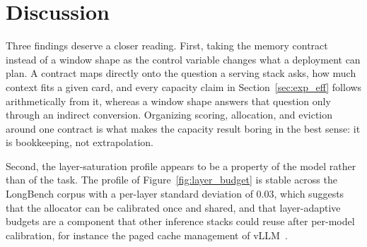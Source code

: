 \section{Discussion}\label{sec:discussion}

Three findings deserve a closer reading. First, taking the memory
contract instead of a window shape as the control variable changes
what a deployment can plan. A contract maps directly onto the question
a serving stack asks, how much context fits a given card, and every
capacity claim in Section~\ref{sec:exp_eff} follows arithmetically
from it, whereas a window shape answers that question only through an
indirect conversion. Organizing scoring, allocation, and eviction
around one contract is what makes the capacity result boring in the
best sense: it is bookkeeping, not extrapolation.

Second, the layer-saturation profile appears to be a property of the
model rather than of the task. The profile of
Figure~\ref{fig:layer_budget} is stable across the LongBench corpus
with a per-layer standard deviation of $0.03$, which suggests that the
allocator can be calibrated once and shared, and that layer-adaptive
budgets are a component that other inference stacks could reuse after
per-model calibration, for
instance the paged cache management of vLLM~\cite{kwon2023vllm}.

